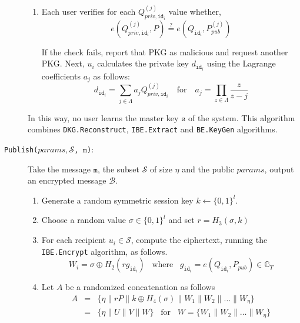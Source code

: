 \documentclass{llncs}
\newcommand{\K}{\ensuremath{\mathtt{s}}}
\newcommand{\msg}{\ensuremath{\mathtt{m}}}
\newcommand{\id}[1]{\ensuremath{\mathtt{id}_{#1}}}
\begin{document}
\begin{description}
\begin{enumerate}
        \item Each user verifies for each $Q_{priv,\id{i}}^{(j)}$ value whether, 
        \begin{equation*}
            e \left( Q_{priv , \id{i} }^{(j)}, P \right ) \stackrel{?}{=} e \left( Q_{\id{i}}, P_{pub}^{(j)} \right)
        \end{equation*}
        
        If the check fails, report that PKG as malicious and request another PKG. Next, $u_i$ calculates the private key $d_{\id{i}}$ using the Lagrange coefficients $a_j$ as follows: 
        \begin{equation*}
            d_{\id{i}} = \sum\limits_{j\in\Lambda} a_j Q_{priv,\id{i}}^{(j)} \quad \textrm{for} \quad a_j = \prod_{z\in \Lambda} \frac{z}{z-j}
        \end{equation*}
    
    \end{enumerate}
    \medskip
    In this way, no user learns the master key $\K$ of the system. This algorithm combines \texttt{DKG.Reconstruct}, \texttt{IBE.Extract} and \texttt{BE.KeyGen} algorithms.

    \bigskip    
    

    \item[\texttt{Publish($params, \mathcal{S}$, \msg)}:] Take the message \msg, the subset $\mathcal{S}$ of size $\eta$ and the public $params$, output an encrypted message $\mathcal{B}$.

    \begin{enumerate}
        \item Generate a random symmetric session key $k \leftarrow \{ 0,1 \}^{l}$.
        \item Choose a random value $\sigma \in \{ 0,1 \}^{l}$ and set $r = H_3 \left( \sigma, k \right)$
        \item For each recipient $u_i \in \mathcal{S}$, compute the ciphertext, running the \texttt{IBE.Encrypt} algorithm, as follows.
            \begin{equation*}
                W_i = \sigma \oplus H_2 \left( r g_{\id{i}} \right) \; \; \; \textrm{where} \; \; \; g_{\id{i}} = e \left( Q_{\id{i}}, P_{pub} \right) \in \mathbb{G}_T
            \end{equation*}
        \item Let $A$ be a randomized concatenation as follows
            \begin{equation*}
                \begin{array}{lcl}
                    A & = & \{ \eta \parallel rP \parallel k \oplus H_4 \left( \sigma \right) \parallel W_1 \parallel W_2 \parallel \ldots \parallel W_\eta \} \\
                    & = & \{ \eta \parallel U \parallel V \parallel W \} \; \; \; \textrm{for} \; \; \; W = \{ W_1 \parallel W_2 \parallel \ldots \parallel W_\eta \}
                \end{array} 
            \end{equation*}
            

\end{enumerate}
\end{description}
\end{document}
